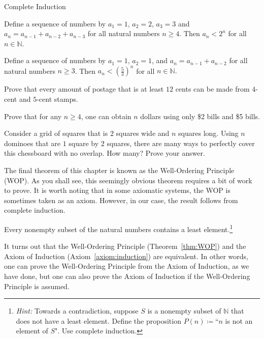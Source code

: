 \begin{section}{Complete Induction}
\begin{theorem}
Define a sequence of numbers by $a_1=1$, $a_2=2$, $a_3=3$ and $a_n=a_{n-1}+a_{n-2}+a_{n-3}$ for all natural numbers $n\geq 4$.  Then $a_n<2^n$ for all $n\in\mathbb N$.
\end{theorem}

\begin{theorem}
Define a sequence of numbers by $a_1=1$, $a_2=1$, and $a_n=a_{n-1}+a_{n-2}$ for all natural numbers $n \geq 3$.  Then $a_n < \left ( \frac{5}{3} \right )^n$ for all $n \in \mathbb{N}.$
\end{theorem}

\begin{problem}
Prove that every amount of postage that is at least $12$ cents can be made from $4$-cent and $5$-cent stamps.
\end{problem}

\begin{problem}
Prove that for any $n \geq 4$, one can obtain $n$ dollars using only \$2 bills and \$5 bills.
\end{problem}

\begin{problem}
Consider a grid of squares that is $2$ squares wide and $n$ squares long.  Using $n$ dominoes that are $1$ square by $2$ squares, there are many ways to perfectly cover this chessboard with no overlap.  How many?  Prove your answer.
\end{problem}

The final theorem of this chapter is known as the Well-Ordering Principle (WOP). As you shall see, this seemingly obvious theorem requires a bit of work to prove. It is worth noting that in some axiomatic systems, the WOP is sometimes taken as an axiom.  However, in our case, the result follows from complete induction.

\begin{theorem}\label{thm:WOP}
Every nonempty subset of the natural numbers contains a least element.\footnote{\emph{Hint:} Towards a contradiction, suppose $S$ is a nonempty subset of $\mathbb{N}$ that does not have a least element.  Define the proposition $P(n)\coloneqq $``$n$ is not an element of $S$". Use complete induction.}
\end{theorem}

It turns out that the Well-Ordering Principle (Theorem~\ref{thm:WOP}) and the Axiom of Induction (Axiom~\ref{axiom:induction}) are equivalent.  In other words, one can prove the Well-Ordering Principle from the Axiom of Induction, as we have done, but one can also prove the Axiom of Induction if the Well-Ordering Principle is assumed.

\end{section}